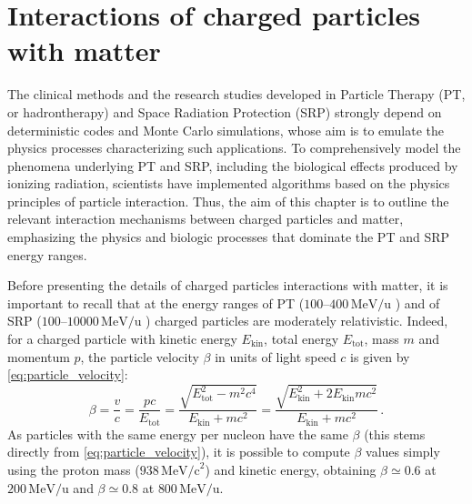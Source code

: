 \chapter{Interactions of charged particles with matter}\label{ch:interaction_charged_particles}
The clinical methods and the research studies developed in Particle Therapy (PT, or hadrontherapy) and Space Radiation Protection (SRP) strongly depend on deterministic codes and Monte Carlo simulations, whose aim is to emulate the physics processes characterizing such applications. To comprehensively model the phenomena underlying PT and SRP, including the biological effects produced by ionizing radiation, scientists have implemented algorithms based on the physics principles of particle interaction. Thus, the aim of this chapter is to outline the relevant interaction mechanisms between charged particles and matter, emphasizing the physics and biologic processes that dominate the PT and SRP energy ranges.

Before presenting the details of charged particles interactions with matter, it is important to recall that at the energy ranges of PT ($100$--$400\,\mathrm{MeV/u}$ \cite{rangeVerification}) and of SRP ($100$--$\num{10000}\,\mathrm{MeV/u}$ \cite{NORBURY2012315}) charged particles are moderately relativistic. Indeed, for a charged particle with kinetic energy $E_\text{kin}$, total energy $E_\text{tot}$, mass $m$ and momentum $p$, the particle velocity $\beta$ in units of light speed $c$ is given by \autoref{eq:particle_velocity}:
\begin{equation}
	\beta
	=
	\frac{v}{c}
	=
	\frac{pc}{E_{\text{tot}}}
	=
	\frac{\sqrt{E_{\text{tot}}^2-m^2c^4}}
	{E_{\text{kin}}+mc^2}
	=
	\frac{\sqrt{E_{\text{kin}}^2+2E_{\text{kin}}mc^2}}
	{E_{\text{kin}}+mc^2}\,.
	\label{eq:particle_velocity}
\end{equation}
As particles with the same energy per nucleon have the same $\beta$ (this stems directly from \autoref{eq:particle_velocity}), it is possible to compute $\beta$ values simply using the proton mass ($938\,\mathrm{MeV/c}^2$) and kinetic energy, obtaining $\beta\simeq0.6$ at $200\,\mathrm{MeV/u}$ and $\beta\simeq0.8$ at $800\,\mathrm{MeV/u}$.

